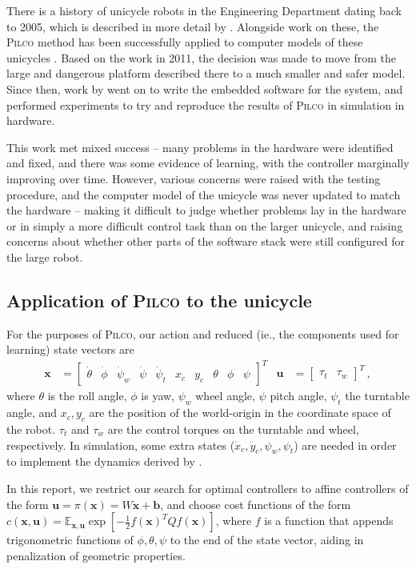 \documentclass[main.tex]{subfiles}
\begin{document}
	There is a history of unicycle robots in the Engineering Department dating back to 2005, which is described in more detail by \citeauthor{quiero} \cite{quiero}.
	Alongside work on these, the \textsc{Pilco} method has been successfully applied to computer models of these unicycles  \cite[section~3.3]{pilco}.
	Based on the work in 2011, the decision was made to move from the large and dangerous platform described there to a much smaller and safer model.
	Since then, work by \citeauthor{aleksi} \cite{aleksi} went on to write the embedded software for the system, and performed experiments to try and reproduce the results of \textsc{Pilco} in simulation in hardware.

	This work met mixed success -- many problems in the hardware were identified and fixed, and there was some evidence of learning, with the controller marginally improving over time.
	However, various concerns were raised with the testing procedure, and the computer model of the unicycle was never updated to match the hardware -- making it difficult to judge whether problems lay in the hardware or in simply a more difficult control task than on the larger unicycle, and raising concerns about whether other parts of the software stack were still configured for the large robot.

	\subsection{Application of \textsc{Pilco} to the unicycle}
		For the purposes of \textsc{Pilco}, our action and reduced (ie., the components used for learning)  state vectors are
		\begin{align}
			\bm{x} &= \begin{bmatrix}
				\dot\theta & \dot\phi &\dot\psi_w & \dot\psi & \dot\psi_t &
				x_c & y_c &
				\theta &
				\phi & \psi
			\end{bmatrix}^T &
			\bm{u} &= \begin{bmatrix}
				\tau_t & \tau_w
			\end{bmatrix}^T\,,
		\end{align}
		where $\theta$ is the roll angle, $\phi$ is yaw, $\psi_w$ wheel angle,
		$\psi$ pitch angle, $\psi_t$ the turntable angle, and $x_c, y_c$ are the position of the world-origin in the coordinate space of the robot.
		$\tau_t$ and $\tau_w$ are the control torques on the turntable and wheel, respectively.
		In simulation, some extra states ($\dot{x}_c, \dot{y}_c, \psi_w, \psi_t$) are needed in order to implement the dynamics derived by \citeauthor{forster} \cite{forster}.

		In this report, we restrict our search for optimal controllers to affine controllers of the form
		$\bm{u} = \pi(\bm{x}) = W\bm{x} + \bm{b}$, and choose cost functions of the form
		$c(\bm{x}, \bm{u}) = \mathbb{E}_{\bm{x}, \bm{u}} \exp\left[-\frac{1}{2} f(\bm{x})^T Q f(\bm{x})\right]$, where $f$ is a function that appends trigonometric functions of $\phi, \theta, \psi$ to the end of the state vector, aiding in penalization of geometric properties.

\bib
\end{document}
